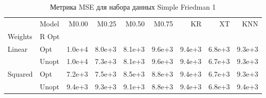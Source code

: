 \begin{table}
\caption{Метрика MSE для набора данных Simple Friedman 1}
\label{tab:MSE_Simple Friedman 1}
\begin{tabular}{llrrrrrrr}
\toprule
 & Model & M0.00 & M0.25 & M0.50 & M0.75 & KR & XT & KNN \\
Weights & R Opt &  &  &  &  &  &  &  \\
\midrule
\multirow[t]{2}{*}{Linear} & Opt & 1.0e+4 & 8.0e+3 & 8.1e+3 & 9.6e+3 & 9.4e+3 & 6.8e+3 & 9.3e+3 \\
 & Unopt & 1.0e+4 & 7.3e+3 & 8.1e+3 & 9.6e+3 & 9.4e+3 & 6.7e+3 & 9.3e+3 \\

\multirow[t]{2}{*}{Squared} & Opt & 7.2e+3 & 7.5e+3 & 8.5e+3 & 8.8e+3 & 9.4e+3 & 6.7e+3 & 9.3e+3 \\
 & Unopt & 9.4e+3 & 9.3e+3 & 9.1e+3 & 8.8e+3 & 9.4e+3 & 6.8e+3 & 9.4e+3 \\

\bottomrule
\end{tabular}
\end{table}
